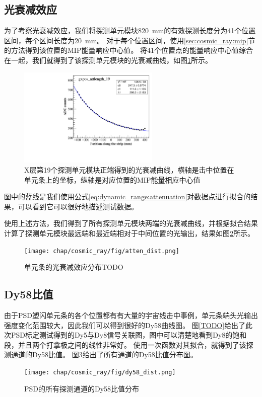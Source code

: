 \subsection{光衰减效应}
\label{sec:cosmic_ray:attenuation}
为了考察光衰减效应，我们将探测单元模块\SI{820}{mm}的有效探测长度分为41个位置区间，每个区间长度为\SI{20}{mm}。
对于每个位置区间，使用\ref{sec:cosmic_ray:mip}节的方法得到该位置的MIP能量响应中心值。
将41个位置点的能量响应中心值综合在一起，我们就得到了该探测单元模块的光衰减曲线，如图\ref{fig:cosmic_ray:attenuation_example}所示。
\begin{figure}[htbp]
	\centering
	\includegraphics[width=0.60\textwidth]{chap/cosmic_ray/fig/attenuation_example.pdf}
	\caption{X层第19个探测单元模块正端得到的光衰减曲线，横轴是击中位置在单元条上的坐标，纵轴是对应位置的MIP能量相应中心值}
	\label{fig:cosmic_ray:attenuation_example}
\end{figure}
图中的蓝线是我们使用公式\ref{eq:dynamic_range:attenuation}对数据点进行拟合的结果，可以看到它可以很好地描述测试数据。

使用上述方法，我们得到了所有探测单元模块两端的光衰减曲线，并根据拟合结果计算了探测单元模块最远端和最近端相对于中间位置的光输出，结果如图\ref{fig:cosmic_ray:atten_dist}所示。
\begin{figure}[htbp]
	\centering
	\texttt{[image: chap/cosmic\_ray/fig/atten\_dist.png]}
	\caption{单元条的光衰减效应分布TODO}
	\label{fig:cosmic_ray:atten_dist}
\end{figure}


\subsection{Dy58比值}
\label{sec:cosmic_ray:dy58}
由于PSD塑闪单元条的各个位置都有有大量的宇宙线击中事例，单元条端头光输出强度变化范围较大，因此我们可以得到很好的Dy58曲线图。
图\ref{TODO}给出了此次PSD标定测试得到的Dy5与Dy8信号关联图，图中可以清楚地看到Dy8的饱和段，并且两个打拿极之间的线性非常好。
使用一次函数对其拟合，就得到了该探测通道的Dy58比值。
图\ref{fig:cosmic_ray:dy58_dist}给出了所有通道的Dy58比值分布图。
\begin{figure}[htbp]
	\centering
	\texttt{[image: chap/cosmic\_ray/fig/dy58\_dist.png]}
	\caption{PSD的所有探测通道的Dy58比值分布}
	\label{fig:cosmic_ray:dy58_dist}
\end{figure}

